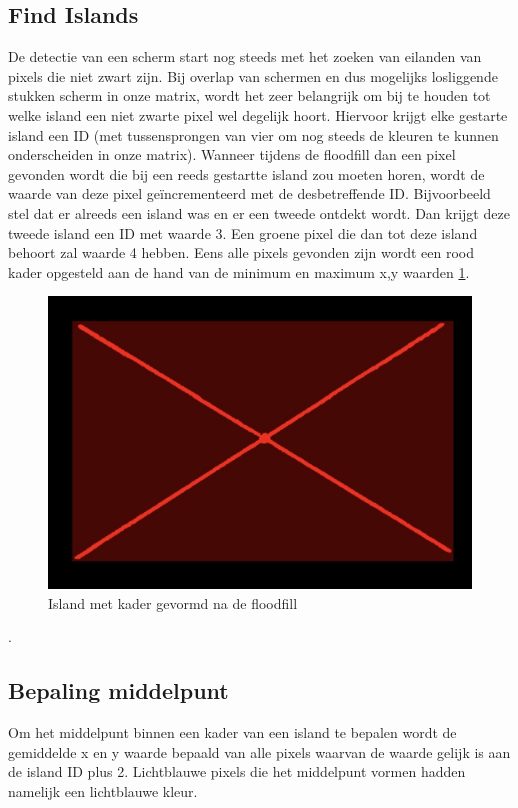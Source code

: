 \subsection{Find Islands}
De detectie van een scherm start nog steeds met het zoeken van eilanden van pixels die niet zwart zijn. Bij overlap van schermen en dus mogelijks losliggende stukken scherm in onze matrix, wordt het zeer belangrijk om bij te houden tot welke island een niet zwarte pixel wel degelijk hoort. Hiervoor krijgt elke gestarte island een ID (met tussensprongen van vier om nog steeds de kleuren te kunnen onderscheiden in onze matrix). Wanneer tijdens de floodfill dan een pixel gevonden wordt die bij een reeds gestartte island zou moeten horen, wordt de waarde van deze pixel geïncrementeerd met de desbetreffende ID. Bijvoorbeeld stel dat er alreeds een island was en er een tweede ontdekt wordt. Dan krijgt deze tweede island een ID met waarde 3. Een groene pixel die dan tot deze island behoort zal waarde 4 hebben. Eens alle pixels gevonden zijn wordt een rood kader opgesteld aan de hand van de minimum en maximum x,y waarden \ref{fig:island}.

\begin{figure} [h]
	\center
	\includegraphics[width=\textwidth]{island}
	\caption{Island met kader gevormd na de floodfill}
	\label{fig:island}
\end{figure}.

\subsection{Bepaling middelpunt}
Om het middelpunt binnen een kader van een island te bepalen wordt de gemiddelde x en y waarde bepaald van alle pixels waarvan de waarde gelijk is aan de island ID plus 2. Lichtblauwe pixels die het middelpunt vormen hadden namelijk een lichtblauwe kleur.

